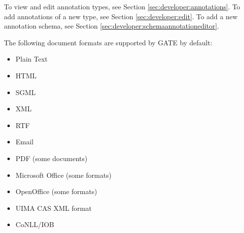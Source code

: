 To view and edit annotation types, see Section \ref{sec:developer:annotations}.
To add annotations of a new type, see Section \ref{sec:developer:edit}.
To add a new annotation schema, see Section
\ref{sec:developer:schemaannotationeditor}.







The following document formats are supported by GATE by default:
\begin{itemize}
\item
Plain Text
\item
HTML
\item
SGML
\item
XML
\item
RTF
\item
Email
\item
PDF (some documents)
\item
Microsoft Office (some formats)
\item
OpenOffice (some formats)
\item
UIMA CAS XML format
\item
CoNLL/IOB
\end{itemize}

